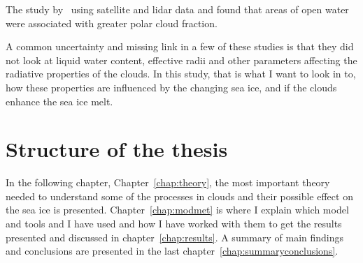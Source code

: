 The study by~\citet{Palm2010} using satellite and lidar data and found that areas of open water were associated with greater polar cloud fraction. %


A common uncertainty and missing link in a few of these studies is that they did not look at liquid water content, effective radii and other parameters affecting the radiative properties of the clouds. In this study, that is what I want to look in to, how these properties are influenced by the changing sea ice, and if the clouds enhance the sea ice melt.






\section{Structure of the thesis}
In the following chapter, Chapter~\ref{chap:theory}, the most important theory needed to understand some of the processes in clouds and their possible effect on the sea ice is presented. Chapter~\ref{chap:modmet} is where I explain which model and tools and I have used and how I have worked with them to get the results presented and discussed in chapter~\ref{chap:results}. A summary of main findings and conclusions are presented in the last chapter~\ref{chap:summaryconclusions}.